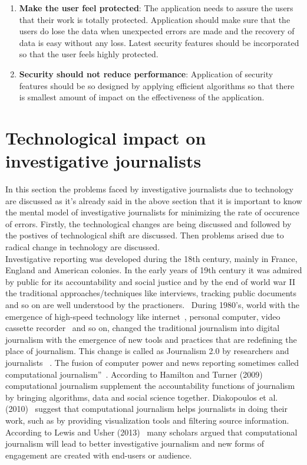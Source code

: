 \begin{enumerate}
 	
 	\item \textbf{Make the user feel protected}: The application needs to assure the users that their work is totally protected.  Application should make sure that the users do lose the data when unexpected errors are made and the recovery of data is easy without any loss.  Latest security features should be incorporated so that the user feels highly protected. 
 	
 	\item \textbf{Security should not reduce performance}: Application of security features should be so designed by applying efficient algorithms so that there is smallest amount of impact on the effectiveness of the application.~\cite{katsabas2005using}	
 	
 \end{enumerate}
 \section{Technological impact on investigative journalists}
 In this section the problems faced by investigative journalists due to technology are discussed as it's already said in the above section that it is important to know the mental model of investigative journalists for minimizing the rate of occurence of errors.	Firstly, the technological changes are being discussed and followed by the postives of technological shift are discussed. Then problems arised due to radical change in technology are discussed.\\

 Investigative reporting was developed during the 18th century, mainly in France, England and American colonies. In the early years of 19th century it was admired by public for its accountability and social justice and by the end of world war II the traditional approaches/techniques like interviews, tracking public documents and so on are well understood by the practioners.~\cite{defleur2013computer} During 1980's, world with the emergence of high-speed technology like internet~\cite{kawamoto2003digital}, personal computer, video cassette recorder~\cite{5oxford2009} and so on,  changed the traditional journalism into digital journalism with the emergence of new tools and practices that are redefining the place of journalism. This change is called as Journalism 2.0 by researchers and journalists ~\cite{kaul2013journalism}. The fusion of computer power and news reporting sometimes called computational journalism''~\cite{flew2012promise}. According to Hamilton and Turner (2009)~\cite{hamilton2009accountability} computational journalism supplement the accountability functions of journalism by bringing algorithms, data and social science together. Diakopoulos et al. (2010)~\cite{diakopoulos2010diamonds} suggest that computational journalism helps journalists in doing their work, such as by providing visualization tools and filtering source information. According to Lewis and Usher (2013)~\cite{lewis2013open} many scholars argued that computational journalism will lead to better investigative journalism and new forms of engagement are created with end-users or audience.\\
 
